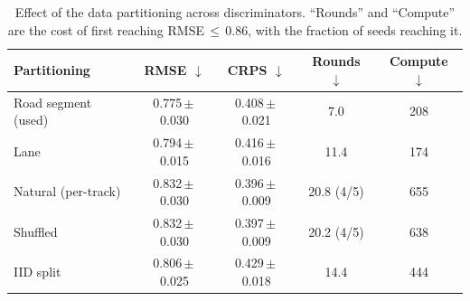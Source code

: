 \begin{table}[!t]\centering
\caption{Effect of the data partitioning across discriminators. ``Rounds'' and ``Compute'' are the cost of first reaching RMSE\,$\leq$\,0.86, with the fraction of seeds reaching it.}
\label{tab:partition}
\begin{tabular}{lcccc}\toprule
Partitioning & RMSE $\downarrow$ & CRPS $\downarrow$ & Rounds $\downarrow$ & Compute $\downarrow$ \\\midrule
Road segment (used) & 0.775\,$\pm$\,0.030 & 0.408\,$\pm$\,0.021 & 7.0 & 208 \\
Lane & 0.794\,$\pm$\,0.015 & 0.416\,$\pm$\,0.016 & 11.4 & 174 \\
Natural (per-track) & 0.832\,$\pm$\,0.030 & 0.396\,$\pm$\,0.009 & 20.8 (4/5) & 655 \\
Shuffled & 0.832\,$\pm$\,0.030 & 0.397\,$\pm$\,0.009 & 20.2 (4/5) & 638 \\
IID split & 0.806\,$\pm$\,0.025 & 0.429\,$\pm$\,0.018 & 14.4 & 444 \\
\bottomrule\end{tabular}\end{table}
